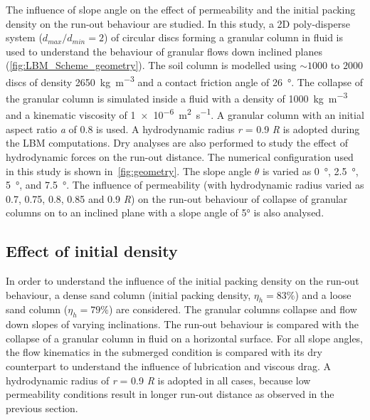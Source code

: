 The influence of slope angle on the effect of permeability and the initial 
packing density on the run-out behaviour are studied. In this study, a 2D 
poly-disperse system ($d_{max}/d_{min} = 2$) of circular discs forming a 
granular column in fluid is used to understand the behaviour of granular flows 
down inclined planes (\cref{fig:LBM_Scheme_geometry}). The soil column is 
modelled using $\sim 1000$ to $2000$ discs of density 
\SI{2650}{\kg\per\cubic\meter} and a contact friction angle of 
\SI{26}{\degree}. The collapse of the granular column is simulated inside a 
fluid with a density of \SI{1000}{\kg\per\cubic\meter} and a kinematic 
viscosity of \SI{1e-6}{\square\meter\per\second}. A granular column with 
an initial aspect ratio \textit{a} of 0.8 is used. A hydrodynamic radius 
\textit{r} = 0.9 \textit{R} is adopted during the LBM computations. Dry 
analyses are also performed to study the effect of hydrodynamic forces on the 
run-out distance. The numerical configuration used in this study is shown 
in~\cref{fig:geometry}. The slope angle $\theta$ is varied as \SI{0}{\degree}, 
\SI{2.5}{\degree}, \SI{5}{\degree}, and \SI{7.5}{\degree}. The influence of 
permeability (with hydrodynamic radius varied as 0.7, 0.75, 0.8, 0.85 and 0.9 
\textit{R}) on the run-out behaviour of collapse of granular columns on to an 
inclined plane with a slope angle of 5\si{\degree} is also analysed. 


\subsection{Effect of initial density}
In order to understand the influence of the initial packing density on the 
run-out behaviour, a dense sand column (initial packing density, $\eta_h=83\%$) 
and a loose sand column ($\eta_h=79\%$) are considered. The granular columns 
collapse and flow down slopes of varying inclinations. The run-out behaviour is 
compared with the collapse of a granular column in fluid on a horizontal 
surface. For all slope angles, the flow kinematics in the submerged condition 
is compared with its dry counterpart to understand the influence of lubrication 
and viscous drag. A hydrodynamic radius of \textit{r} = 0.9 \textit{R} is 
adopted in all cases, because low permeability conditions result in longer 
run-out distance as observed in the previous section.



